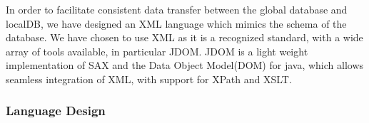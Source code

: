 In order to facilitate consistent data transfer between the global database and localDB, we have designed an XML language which mimics
the schema of the database. We have chosen to use XML as it is a recognized standard, with a wide array of tools available, in particular JDOM\cite{www.jdom.org}.
JDOM is a light weight implementation of SAX and the Data Object Model(DOM) for java, which allows seamless integration of XML, with support for XPath and XSLT.

\subsubsection{Language Design}